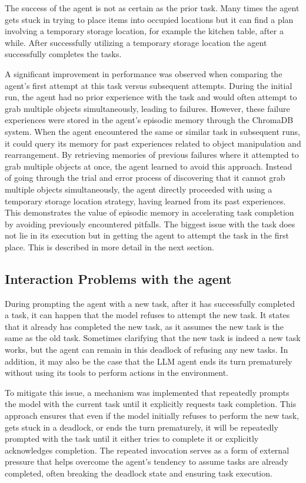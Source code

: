 \documentclass[../report.tex]{subfiles}
\begin{document}
The success of the agent is not as certain as the prior task. Many times the agent gets stuck in trying to place items into occupied locations but it can find a plan involving a temporary storage location, for example the kitchen table, after a while. After successfully utilizing a temporary storage location the agent successfully completes the tasks. 

A significant improvement in performance was observed when comparing the agent's first attempt at this task versus subsequent attempts. During the initial run, the agent had no prior experience with the task and would often attempt to grab multiple objects simultaneously, leading to failures. However, these failure experiences were stored in the agent's episodic memory through the ChromaDB system. When the agent encountered the same or similar task in subsequent runs, it could query its memory for past experiences related to object manipulation and rearrangement. By retrieving memories of previous failures where it attempted to grab multiple objects at once, the agent learned to avoid this approach. Instead of going through the trial and error process of discovering that it cannot grab multiple objects simultaneously, the agent directly proceeded with using a temporary storage location strategy, having learned from its past experiences. This demonstrates the value of episodic memory in accelerating task completion by avoiding previously encountered pitfalls. The biggest issue with the task does not lie in its execution but in getting the agent to attempt the task in the first place. This is described in more detail in the next section.

\subsection{Interaction Problems with the agent}
During prompting the agent with a new task, after it has successfully completed a task, it can happen that the model refuses to attempt the new task. It states that it already has completed the new task, as it assumes the new task is the same as the old task. Sometimes clarifying that the new task is indeed a new task works, but the agent can remain in this deadlock of refusing any new tasks. In addition, it may also be the case that the LLM agent ends its turn prematurely without using its tools to perform actions in the environment.

To mitigate this issue, a mechanism was implemented that repeatedly prompts the model with the current task until it explicitly requests task completion. This approach ensures that even if the model initially refuses to perform the new task, gets stuck in a deadlock, or ends the turn prematurely, it will be repeatedly prompted with the task until it either tries to complete it or explicitly acknowledges completion. The repeated invocation serves as a form of external pressure that helps overcome the agent's tendency to assume tasks are already completed, often breaking the deadlock state and ensuring task execution.
\end{document}
